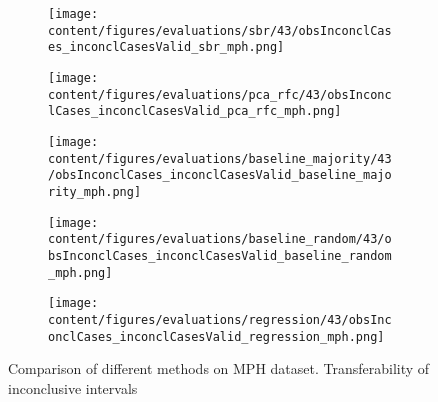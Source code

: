 \begin{figure}[ht]
  \begin{subfigure}{0.5\textwidth}
    \centering
    \texttt{[image: content/figures/evaluations/sbr/43/obsInconclCases\_inconclCasesValid\_sbr\_mph.png]}
  \end{subfigure}
  \hfill
  \begin{subfigure}{0.5\textwidth}
    \centering
    \texttt{[image: content/figures/evaluations/pca\_rfc/43/obsInconclCases\_inconclCasesValid\_pca\_rfc\_mph.png]}
  \end{subfigure}
  \hfill
  \begin{subfigure}{0.5\textwidth}
    \centering
    \texttt{[image: content/figures/evaluations/baseline\_majority/43/obsInconclCases\_inconclCasesValid\_baseline\_majority\_mph.png]}
  \end{subfigure}
  \hfill
  \begin{subfigure}{0.5\textwidth}
    \centering
    \texttt{[image: content/figures/evaluations/baseline\_random/43/obsInconclCases\_inconclCasesValid\_baseline\_random\_mph.png]}
  \end{subfigure}
  \hfill
  \begin{subfigure}{0.5\textwidth}
    \centering
    \texttt{[image: content/figures/evaluations/regression/43/obsInconclCases\_inconclCasesValid\_regression\_mph.png]}
  \end{subfigure}

  \caption{Comparison of different methods on MPH dataset. Transferability of inconclusive intervals}
  \label{fig:test_interval_match_mph}
\end{figure}



